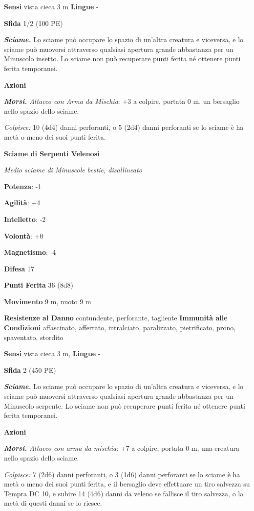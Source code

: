 \begin{multicols}{2}
\textbf{Sensi} vista cieca 3 m \textbf{Lingue} -

\textbf{Sfida} 1/2 (100 PE)

\emph{\textbf{Sciame.}} Lo sciame può occupare lo spazio di un'altra
creatura e viceversa, e lo sciame può muoversi attraverso qualsiasi
apertura grande abbastanza per un Minuscolo insetto. Lo sciame non può
recuperare punti ferita né ottenere punti ferita temporanei.

\textbf{Azioni}

\emph{\textbf{Morsi.} Attacco con Arma da Mischia}: +3 a colpire,
portata 0 m, un bersaglio nello spazio dello sciame.

\emph{Colpisce:} 10 (4d4) danni perforanti, o 5 (2d4) danni perforanti
se lo sciame è ha metà o meno dei suoi punti ferita.



\textbf{Sciame di Serpenti Velenosi}

\emph{Medio sciame di Minuscole bestie, disallineato}

\textbf{Potenza}: -1

\textbf{Agilità}: +4

\textbf{Intelletto}: -2

\textbf{Volontà}: +0

\textbf{Magnetismo}: -4

\textbf{Difesa} 17

\textbf{Punti Ferita} 36 (8d8)

\textbf{Movimento} 9 m, nuoto 9 m

\textbf{Resistenze al Danno} contundente, perforante, tagliente
\textbf{Immunità alle Condizioni} affascinato, afferrato, intralciato,
paralizzato, pietrificato, prono, spaventato, stordito

\textbf{Sensi} vista cieca 3 m,  \textbf{Lingue} -

\textbf{Sfida} 2 (450 PE)

\emph{\textbf{Sciame.}} Lo sciame può occupare lo spazio di un'altra
creatura e viceversa, e lo sciame può muoversi attraverso qualsiasi
apertura grande abbastanza per un Minuscolo serpente. Lo sciame non può
recuperare punti ferita né ottenere punti ferita temporanei.

\textbf{Azioni}

\emph{\textbf{Morsi.} Attacco con arma da mischia}: +7 a colpire,
portata 0 m, una creatura nello spazio dello sciame.

\emph{Colpisce:} 7 (2d6) danni perforanti, o 3 (1d6) danni perforanti se
lo sciame è ha metà o meno dei suoi punti ferita, e il bersaglio deve
effettuare un tiro salvezza su Tempra DC 10, e subire 14 (4d6)
danni da veleno se fallisce il tiro salvezza, o la metà di questi danni
se lo riesce.


\end{multicols}
